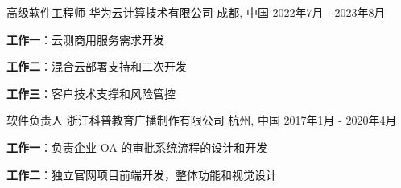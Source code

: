 

\begin{cventries}

  \cventry
    {高级软件工程师} %
    {华为云计算技术有限公司} %
    {成都, 中国}
    {2022年7月 - 2023年8月} %
    {
      \begin{cvitems} %
        \item {\textbf{工作一}：云测商用服务需求开发}
        \item {\textbf{工作二}：混合云部署支持和二次开发}
        \item {\textbf{工作三}：客户技术支撑和风险管控}
      \end{cvitems}
    }

  \cventry
    {软件负责人} %
    {浙江科普教育广播制作有限公司} %
    {杭州, 中国}
    {2017年1月 - 2020年4月} %
    {
      \begin{cvitems} %
        \item {\textbf{工作一}：负责企业 OA 的审批系统流程的设计和开发}
        \item {\textbf{工作二}：独立官网项目前端开发，整体功能和视觉设计}
      \end{cvitems}
    }


\end{cventries}
